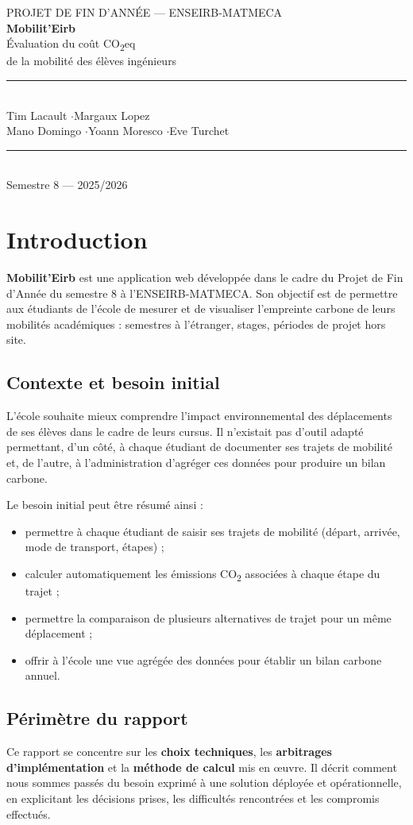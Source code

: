 \documentclass[11pt,a4paper]{article}
\newcommand{\maketitlepage}{%
  \begin{titlepage}
    \pagecolor{accent}
    \color{white}
    \vspace*{3cm}
    \begin{center}
      {\fontsize{9pt}{11pt}\selectfont\MakeUppercase{Projet de Fin d'Année --- ENSEIRB-MATMECA}}\\[0.6cm]
      {\fontsize{36pt}{40pt}\selectfont\bfseries Mobilit'Eirb}\\[0.3cm]
      {\fontsize{13pt}{16pt}\selectfont\color{accentmid}
        Évaluation du coût CO\textsubscript{2}eq\\[0.1cm]
        de la mobilité des élèves ingénieurs}\\[2.5cm]
      \textcolor{accentmid}{\rule{6cm}{0.6pt}}\\[1.2cm]
      {\large
        Tim Lacault \quad$\cdot$\quad Margaux Lopez\\[0.3cm]
        Mano Domingo \quad$\cdot$\quad Yoann Moresco \quad$\cdot$\quad Eve Turchet}\\[2.5cm]
      \textcolor{accentmid}{\rule{6cm}{0.6pt}}\\[0.8cm]
      {\normalsize Semestre 8 — 2025/2026}
    \end{center}
    \vfill
  \end{titlepage}
  \nopagecolor
}
\begin{document}
\maketitlepage

\newpage
\renewcommand{\contentsname}{Table des matières}
{
  \hypersetup{linkcolor=darkgray}
  \tableofcontents
}
\newpage

\section{Introduction}

\textbf{Mobilit'Eirb} est une application web développée dans le cadre du Projet de Fin d'Année du semestre 8 à l'ENSEIRB-MATMECA. Son objectif est de permettre aux étudiants de l'école de mesurer et de visualiser l'empreinte carbone de leurs mobilités académiques : semestres à l'étranger, stages, périodes de projet hors site.

\subsection{Contexte et besoin initial}

L'école souhaite mieux comprendre l'impact environnemental des déplacements de ses élèves dans le cadre de leurs cursus. Il n'existait pas d'outil adapté permettant, d'un côté, à chaque étudiant de documenter ses trajets de mobilité et, de l'autre, à l'administration d'agréger ces données pour produire un bilan carbone.

Le besoin initial peut être résumé ainsi :
\begin{itemize}
  \item permettre à chaque étudiant de saisir ses trajets de mobilité (départ, arrivée, mode de transport, étapes) ;
  \item calculer automatiquement les émissions CO\textsubscript{2} associées à chaque étape du trajet ;
  \item permettre la comparaison de plusieurs alternatives de trajet pour un même déplacement ;
  \item offrir à l'école une vue agrégée des données pour établir un bilan carbone annuel.
\end{itemize}

\subsection{Périmètre du rapport}

Ce rapport se concentre sur les \textbf{choix techniques}, les \textbf{arbitrages d'implémentation} et la \textbf{méthode de calcul} mis en œuvre. Il décrit comment nous sommes passés du besoin exprimé à une solution déployée et opérationnelle, en explicitant les décisions prises, les difficultés rencontrées et les compromis effectués.
\end{document}
